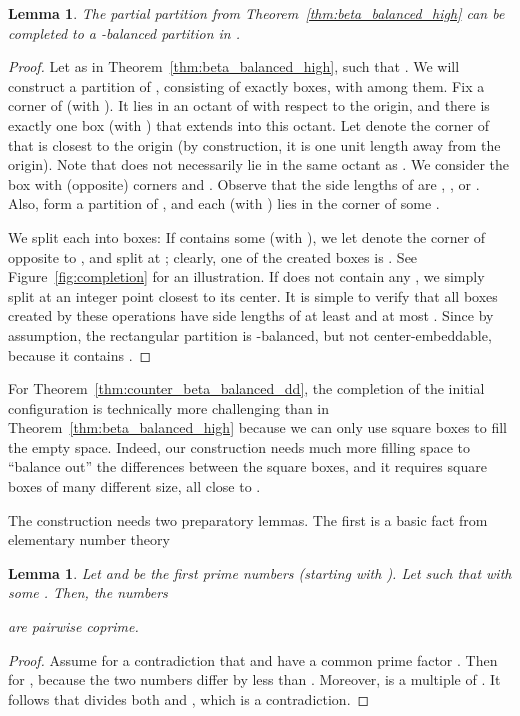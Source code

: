 \documentclass[12pt]{article}
\newtheorem{lemma}[theorem]{Lemma}
\begin{document}
\begin{appendix}
\begin{lemma}\label{lem:first_filling_lemma}
The partial partition  from Theorem~\ref{thm:beta_balanced_high}
can be completed to a -balanced partition in .
\end{lemma}
\begin{proof}
Let  as in Theorem~\ref{thm:beta_balanced_high}, such that .
We will construct a partition of , consisting of exactly  boxes, 
with  among them.
Fix a corner  of  (with ). 
It lies in an octant of  with respect to the origin, and there
is exactly one box  (with ) that extends into this octant.
Let  denote the corner of  that is closest to the origin
(by construction, it is one unit length away from the origin).
Note that  does not necessarily lie in the same octant as .
We consider the box  
with (opposite) corners  and .
Observe that the side lengths of  are , , or .
Also,  form a partition of , and each  (with )
lies in the corner of some .

We split each 
into  boxes: If  contains some  (with ), 
we let  denote the corner of  opposite to , and split  at ;
clearly, one of the  created boxes is . See Figure~\ref{fig:completion} for an illustration.
If  does not contain any , we simply split at an integer point closest to its center.
It is simple to verify that all boxes created by these operations have side lengths of at least 
and at most . Since  by assumption, the rectangular partition is -balanced,
but not center-embeddable, because it contains .
\end{proof}

For Theorem~\ref{thm:counter_beta_balanced_dd}, the completion of the initial configuration 
is technically more challenging than 
in Theorem~\ref{thm:beta_balanced_high} because we can only use 
square boxes to fill the empty space. Indeed, our construction needs much
more filling space to ``balance out'' the differences between the
square boxes, and it requires square boxes of many different size, all close to .

The construction needs two preparatory lemmas. The first is a basic fact from elementary number theory

\begin{lemma}\label{lem:coprime_lemma}
Let  and  be the first  prime numbers (starting with ).
Let  such that  with some .
Then, the  numbers

are pairwise coprime.
\end{lemma}
\begin{proof}
Assume for a contradiction that  and  have a common prime factor .
Then  for , because the two numbers differ by less than .
Moreover,  is a multiple of . It follows that  divides both 
and , which is a contradiction.
\end{proof}


\end{appendix}
\end{document}
